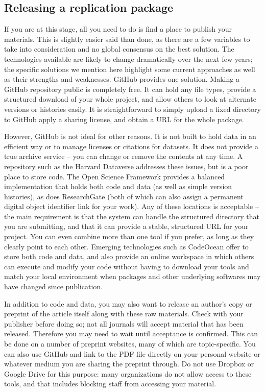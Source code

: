 \subsection{Releasing a replication package}

If you are at this stage,
all you need to do is find a place to publish your materials.
This is slightly easier said than done,
as there are a few variables to take into consideration
and no global consensus on the best solution.
The technologies available are likely to change dramatically
over the next few years;
the specific solutions we mention here highlight some current approaches
as well as their strengths and weaknesses.
GitHub provides one solution.
Making a GitHub repository public is completely free.
It can hold any file types,
provide a structured download of your whole project,
and allow others to look at alternate versions or histories easily.
It is straightforward to simply upload a fixed directory to GitHub
apply a sharing license, and obtain a URL for the whole package.

However, GitHub is not ideal for other reasons.
It is not built to hold data in an efficient way
or to manage licenses or citations for datasets.
It does not provide a true archive service --
you can change or remove the contents at any time.
A repository such as the Harvard Dataverse
addresses these issues, but is a poor place to store code.
The Open Science Framework
provides a balanced implementation
that holds both code and data (as well as simple version histories),
as does ResearchGate
(both of which can also assign a permanent digital object identifier link for your work).
Any of these locations is acceptable --
the main requirement is that the system can handle
the structured directory that you are submitting,
and that it can provide a stable, structured URL for your project.
You can even combine more than one tool if you prefer,
as long as they clearly point to each other.
Emerging technologies such as CodeOcean
offer to store both code and data,
and also provide an online workspace in which others
can execute and modify your code
without having to download your tools and match your local environment
when packages and other underlying softwares may have changed since publication.

In addition to code and data,
you may also want to release an author's copy or preprint
of the article itself along with these raw materials.
Check with your publisher before doing so;
not all journals will accept material that has been released.
Therefore you may need to wait until acceptance is confirmed.
This can be done on a number of preprint websites,
many of which are topic-specific.
You can also use GitHub and link to the PDF file directly
on your personal website or whatever medium you are
sharing the preprint through.
Do not use Dropbox or Google Drive for this purpose:
many organizations do not allow access to these tools,
and that includes blocking staff from accessing your material.
